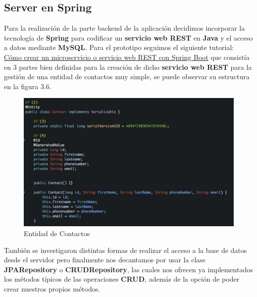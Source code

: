 \newpage
\subsection{Server en Spring} 
\label{makereference3.6.5}

\begin{flushleft}
    Para la realización de la parte backend de la aplicación decidimos
    incorporar la tecnología de \textbf{Spring} para codificar un \textbf{servicio web REST} en \textbf{Java}
    y el acceso a datos mediante \textbf{MySQL}.
\break
\break
    Para el prototipo seguimos el siguiente tutorial: 
\newline
\href{http://sinbugs.com/como-crear-un-microservicio-o-servicio-web-rest-con-spring-boot-1/}{Cómo crear un microservicio o servicio web REST con Spring Boot}
\break
    que consistía en 3 partes bien definidas para la creación de dicho \textbf{servicio web REST} para la gestión de una entidad de contactos muy simple, se puede observar su estructura
    en la figura 3.6.
    \begin{figure}[H]
        \centering
        \includegraphics[width=6in]{figures/ContactsEntity.png}
        \caption{Entidad de Contactos}
    \end{figure}
\break
\break
    También se investigaron distintas formas de realizar el acceso a la base de datos desde el servidor pero finalmente nos decantamos por usar la
    clase \textbf{JPARepository} o \textbf{CRUDRepository}, las cuales nos ofrecen ya implementados los métodos típicos de las operaciones \textbf{CRUD}, además de la opción 
    de poder crear nuestros propios métodos.
\end{flushleft}

